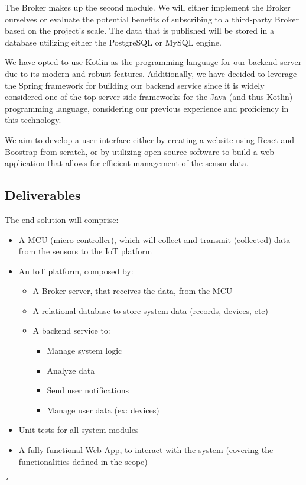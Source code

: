 \documentclass[a4paper,twoside,11pt]{article}
\begin{document}
The Broker makes up the second module. We will either implement the Broker ourselves or evaluate the potential benefits of subscribing to a third-party Broker based on the project's scale.
The data that is published will be stored in a database utilizing either the PostgreSQL or MySQL engine.

We have opted to use Kotlin as the programming language for our backend server due to its modern and robust features. Additionally, we have decided to leverage the Spring framework for building our backend service since it is widely considered one of the top server-side frameworks for the Java (and thus Kotlin) programming language, considering our previous experience and proficiency in this technology.

We aim to develop a user interface either by creating a website using React and Boostrap from scratch, or by utilizing open-source software to build a web application that allows for efficient management of the sensor data.



\subsection{Deliverables}
The end solution will comprise:
\begin{itemize}
    \item A MCU (micro-controller), which will collect and transmit (collected) data from the sensors to the IoT platform
    \item An IoT platform, composed by:
    \begin{itemize}
        \item A Broker server, that receives the data, from the MCU
        \item A relational database to store system data (records, devices, etc) 
        \item A backend service to:
        \begin{itemize}
            \item Manage system logic
            \item Analyze data
            \item Send user notifications
            \item Manage user data (ex: devices)
        \end{itemize}
    \end{itemize}
    \item Unit tests for all system modules
    \item A fully functional Web App, to interact with the system (covering the functionalities defined in the scope)
\end{itemize}
´
\bigbreak
\end{document}
